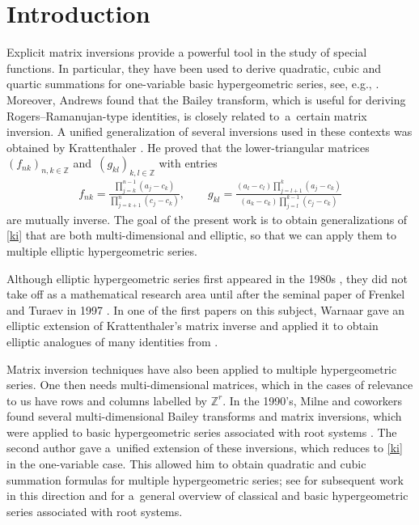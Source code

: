 \documentclass[pdftex]{sigma}%
\numberwithin{equation}{section}
\begin{document}

\renewcommand{\thefootnote}{\arabic{footnote}}
\setcounter{footnote}{0}

\section{Introduction}

Explicit matrix inversions provide a powerful tool in the study of special functions.
In particular, they have been used to derive quadratic, cubic and quartic summations for one-variable basic hypergeometric series, see, e.g., \cite{g,gr,gs,rh,rh2}. Moreover,
Andrews \cite{a} found that the Bailey transform, which is useful for deriving Rogers--Ramanujan-type identities,
 is closely related to~a~certain matrix inversion.
A unified generalization of several inversions used in these contexts was obtained by
Krattenthaler \cite{k}. He proved that the lower-triangular matrices $(f_{nk})_{n,k\in\mathbb Z}$ and~$(g_{kl})_{k,l\in\mathbb Z}$ with entries
\begin{gather}\label{ki}
f_{nk}=\frac{\prod\limits_{j=k}^{n-1}(a_j-c_k)}{\prod\limits_{j=k+1}^n(c_j-c_k)},\qquad
g_{kl}=\frac{(a_l-c_l)\prod\limits_{j=l+1}^k(a_j-c_k)}{(a_k-c_k)\prod\limits_{j=l}^{k-1}(c_j-c_k)}
\end{gather}
are mutually inverse.
The goal of the present work is to obtain generalizations of \eqref{ki} that are both multi-dimensional and elliptic, so that we can apply them to multiple elliptic hypergeometric series.
\pagebreak

Although elliptic hypergeometric series first appeared in the 1980s \cite{dj}, they did not take off as a mathematical research area until after the seminal paper of Frenkel and Turaev in 1997 \cite{ft}. In one of the first papers on this subject, Warnaar gave an elliptic extension of Krattenthaler's matrix inverse \cite[Lemma~3.2]{w}
and applied it to obtain elliptic analogues of many identities from \cite{g,gr,gs,rh2}.

Matrix inversion techniques have also been applied to multiple hypergeometric series.
One then needs multi-dimensional matrices, which in the cases of relevance to us have rows and columns labelled by $\mathbb Z^r$. In the 1990's, Milne and coworkers found several multi-dimensional Bailey transforms and matrix inversions, which were applied to basic hypergeometric series associated with root systems \cite{bm,lm,m,ml,ml2}.
The second author \cite[Theorem~3.1]{s} gave a~unified extension of these inversions, which reduces to \eqref{ki} in the one-variable case. This allowed him to obtain quadratic and cubic summation formulas for multiple hypergeometric series; see
\cite{ks,ls2,ls3,s2,s3,s07,s4,s09} for subsequent work in this direction and \cite{sab} for a~general overview of classical and basic hypergeometric series associated with root systems.
\end{document}
